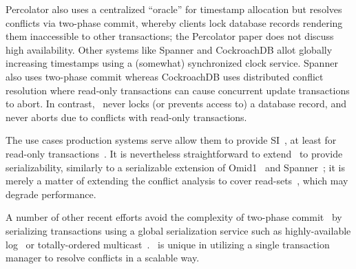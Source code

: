 Percolator also uses a centralized ``oracle'' for timestamp allocation but  resolves conflicts via two-phase commit, whereby 
clients lock database records rendering them inaccessible to other transactions;
the Percolator paper does not discuss high availability. Other systems like Spanner and CockroachDB allot globally increasing
timestamps using a (somewhat) synchronized clock service. Spanner also uses two-phase commit whereas CockroachDB uses
distributed conflict resolution where read-only transactions can cause concurrent update transactions to abort. In contrast, \sys\ never locks
(or prevents access to) a database record, and never aborts due to conflicts with read-only transactions.

The use cases production systems serve allow them to provide SI~\cite{Percolator2010,OmidICDE2014,Tephra,cockroach}, at least for read-only transactions~\cite{Spanner2012}. It is nevertheless straightforward to 
extend \sys\ to provide serializability, similarly to a serializable extension of Omid1~\cite{YabandehCritique2012} and Spanner~\cite{Spanner2012}; 
it is merely a matter of extending the conflict analysis to cover read-sets~\cite{FeketeTODS2005,Cahill2008}, which may degrade performance. 

A number of other recent efforts avoid the complexity of two-phase commit~\cite{DBLP:conf/sigmod/GrayHOS96} by serializing 
transactions using a global serialization service such as highly-available log~\cite{Balakrishnan2013, eyal2013ordering, Hyder} or totally-ordered multicast~\cite{Camargos07sprint}. \sys\ is unique in utilizing a single transaction manager to resolve conflicts in a scalable way. 


